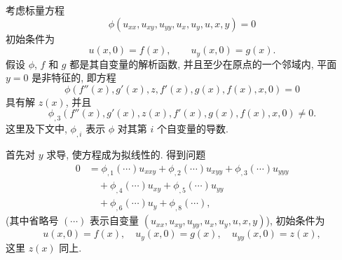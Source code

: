 \begin{Example}\label{ex:scalar-general-reduction}考虑标量方程
\begin{equation}\label{eq:scalar-nonlinear-reduction-origin}
\phi(u_{xx},u_{xy},u_{yy},u_x,u_y,u,x,y)=0
\end{equation}
初始条件为
\begin{equation}\label{eq:scalar-nonlinear-reduction-initial}
u(x,0)=f(x),\qquad u_y(x,0)=g(x).
\end{equation}
假设 $\phi$, $f$ 和 $g$ 都是其自变量的解析函数, 并且至少在原点的一个邻域内, 平面 $y=0$ 是非特征的, 即方程
\begin{equation}\label{eq:scalar-nonlinear-initial-constraint}
\phi(f''(x),g'(x),z,f'(x),g(x),f(x),x,0)=0
\end{equation}
具有解 $z(x)$, 并且
\begin{equation}\label{eq:scalar-nonlinear-noncharacteristic}
\phi_{,3}(f''(x),g'(x),z(x),f'(x),g(x),f(x),x,0)\ne0.
\end{equation}
这里及下文中, $\phi_{,i}$ 表示 $\phi$ 对其第 $i$ 个自变量的导数.

首先对 $y$ 求导, 使方程成为拟线性的. 得到问题
\begin{equation}\label{eq:differentiated-scalar-nonlinear-equation}
\begin{aligned}
0&=\phi_{,1}(\cdots)u_{xxy}+\phi_{,2}(\cdots)u_{xyy}+\phi_{,3}(\cdots)u_{yyy}\\
&\quad+\phi_{,4}(\cdots)u_{xy}+\phi_{,5}(\cdots)u_{yy}\\
&\quad+\phi_{,6}(\cdots)u_y+\phi_{,8}(\cdots),
\end{aligned}
\end{equation}
(其中省略号 $(\cdots)$ 表示自变量 $(u_{xx},u_{xy},u_{yy},u_x,u_y,u,x,y)$), 初始条件为
\begin{equation}\label{eq:differentiated-scalar-initial-data}
u(x,0)=f(x),\quad u_y(x,0)=g(x),\quad u_{yy}(x,0)=z(x),
\end{equation}
这里 $z(x)$ 同上.


\end{Example}
